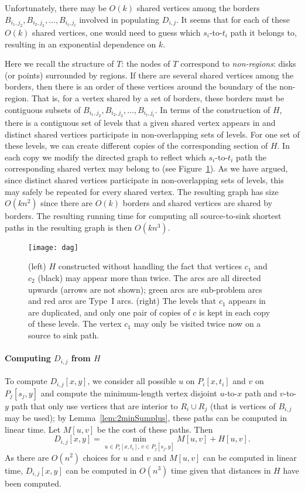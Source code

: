 \documentclass[11pt,twoside]{article}
\newcommand{\spath}[1]{P_{#1}}
\newcommand{\region}[1]{R_{#1}}
\newcommand{\border}[2]{B_{#1,#2}}
\begin{document}
Unfortunately, there may be $O(k)$ shared vertices among the borders \\ $\border{i_1}{j_2},\border{i_2}{j_2},\ldots,\border{i_t}{j_t}$ involved in populating $D_{i,j}$.
  It seems that for each of these $O(k)$ shared vertices, one would need to guess which $s_i$-to-$t_i$ path it belongs to, resulting in an exponential dependence on $k$. 

Here we recall the structure of $T$: the nodes of $T$ correspond to {\em non-regions}: disks (or points) surrounded by regions.  If there are several shared vertices among the borders, then there is an order of these vertices around the boundary of the non-region.  That is, for a vertex shared by a set of borders, these borders must be contiguous subsets of $\border{i_1}{j_2},\border{i_2}{j_2},\ldots,\border{i_t}{j_t}$.  In terms of the construction of $H$, there is a contiguous set of levels that a given shared vertex appears in and distinct shared vertices participate in non-overlapping sets of levels.  For one set of these levels, we can create different copies of the corresponding section of $H$.  In each copy we modify the directed graph to reflect which $s_i$-to-$t_i$ path the corresponding shared vertex may belong to (see Figure~\ref{fig:copies}).  As we have argued, since distinct shared vertices participate in non-overlapping sets of levels, this may safely be repeated for every shared vertex.  The resulting graph has size $O(kn^2)$ since there are $O(k)$ borders and shared vertices are shared by borders.  The resulting running time for computing all source-to-sink shortest paths in the resulting graph is then $O(kn^3)$.

\begin{figure}[ht]
  \centering
  \texttt{[image: dag]}
\caption{(left) $H$ constructed without handling the fact that vertices $c_1$ and $c_2$ (black) may appear more than twice.  The arcs are all directed upwards (arrows are not shown); green arcs are sub-problem arcs and red arcs are Type~I arcs. (right) The levels that $c_1$ appears in are duplicated, and only one pair of copies of $c$ is kept in each copy of these levels. The vertex $c_1$ may only be visited twice now on a source to sink path.}
\label{fig:copies}
\end{figure}

\paragraph{Computing $D_{i,j}$ from $H$}
To compute $D_{i,j}[x,y]$, we consider all possible $u$ on $\spath{i}[x,t_i]$ and $v$ on $\spath{j}[s_j,y]$ and compute the minimum-length vertex disjoint $u$-to-$x$ path and $v$-to-$y$ path that only use vertices that are interior to $\region{i} \cup \region{j}$ (that is vertices of $\border{i}{j}$ may be used); by Lemma~\ref{lem:2minSumplus}, these paths can be computed in linear time.  Let $M[u,v]$ be the cost of these paths.  Then
\[
D_{i,j}[x,y] = \min_{u \in \spath{i}[x,t_i],\, v \in \spath{j}[s_j,y]} M[u,v]+H[u,v].
\]
As there are $O(n^2)$ choices for $u$ and $v$ and $M[u,v]$ can be computed in linear time, $D_{i,j}[x,y]$ can be computed in $O(n^3)$ time given that distances in $H$ have been computed.
\end{document}
